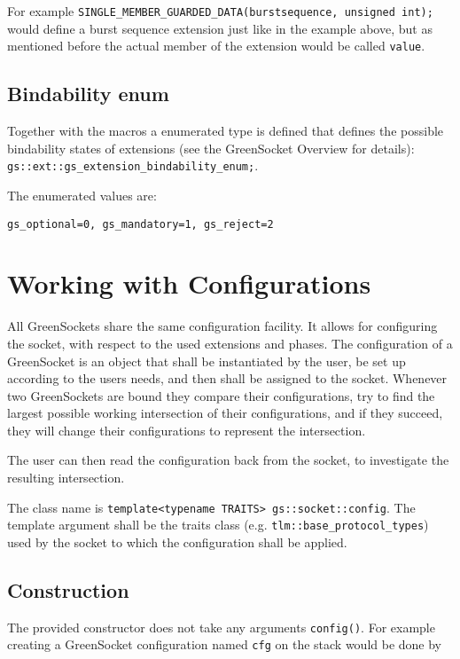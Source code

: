 \documentclass[a4paper,10pt]{article}          %
\begin{document}
For example \verb|SINGLE_MEMBER_GUARDED_DATA(burstsequence, unsigned int);| would define a burst sequence extension just like in the example above, but as mentioned before the actual member of the extension would be called \verb|value|.

\subsection{Bindability enum}

Together with the macros a enumerated type is defined that defines the possible bindability states of extensions (see the GreenSocket Overview for details): \verb|gs::ext::gs_extension_bindability_enum;|.

The enumerated values are: 

\verb|gs_optional=0, gs_mandatory=1, gs_reject=2|

\section{Working with Configurations}

All GreenSockets share the same configuration facility. It allows for configuring the socket, with respect to the used extensions and phases. 
The configuration of a GreenSocket is an object that shall be instantiated by the user, be set up according to the users needs, and then shall be assigned to the socket. Whenever two GreenSockets are bound they compare their configurations, try to find the largest possible working intersection of their configurations, and if they succeed, they will change their configurations to represent the intersection.

The user can then read the configuration back from the socket, to investigate the resulting intersection.

The class name is \verb|template<typename TRAITS> gs::socket::config|. The template argument shall be the traits class (e.g. \verb|tlm::base_protocol_types|) used by the socket to which the configuration shall be applied.

\subsection{Construction}

The provided constructor does not take any arguments \verb|config()|. For example creating a GreenSocket configuration named \verb|cfg| on the stack would be done by 
\end{document}
